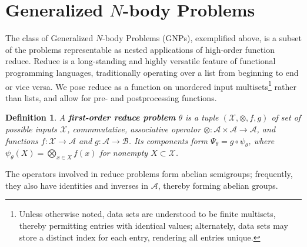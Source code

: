 \documentclass{article}
\newtheorem{definition} {Definition}
\newcommand{\killspace}{\vspace{-0.08in}}
\newcommand{\comp}{\mathbin{\circ}}
\begin{document}
%  
%  
%  
%  

\section{Generalized $N$-body Problems}

The class of Generalized $N$-body Problems (GNPs), exemplified above,
is a subset of the problems representable as nested applications of high-order function
reduce.  Reduce is a long-standing and highly versatile feature of
functional programming languages, traditionally operating over a list
from beginning to end or vice versa.  We pose reduce as a function on
unordered input multisets\footnote{Unless otherwise noted, data sets
are understood to be finite multisets, thereby permitting entries with
identical values; alternately, data sets may store a distinct index
for each entry, rendering all entries unique.} rather than lists, and
allow for pre- and postprocessing functions.
\begin{definition}
  A {\bf first-order reduce problem} $\theta$ is a tuple
  $(\mathcal{X},\otimes,f,g)$ of set of possible inputs $\mathcal{X}$,
  commmutative, associative operator $\otimes \colon \mathcal{A}
  \times \mathcal{A} \to \mathcal{A}$, and functions $f \colon
  \mathcal{X} \to \mathcal{A}$ and $g \colon \mathcal{A} \to
  \mathcal{B}$.  Its components form $\Psi_{\theta} = g \comp
  \psi_{\theta}$, where $\psi_{\theta}(X) = \bigotimes_{x \in X} f(x)$
  for nonempty $X \subset \mathcal{X}$.
\end{definition}
\killspace
\noindent The operators involved in reduce problems form abelian
semigroups; frequently, they also have identities and inverses in
$\mathcal{A}$, thereby forming abelian groups.
\end{document}

